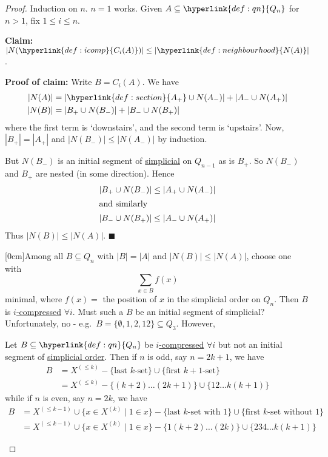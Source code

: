 \documentclass{article}
\let\subset\subseteq
\begin{document}
\begin{proof}
  Induction on $n$. $n=1$ works.
  Given $A \subset \hyperlink{def:qn}{Q_n}$ for $n > 1$, fix $1 \leq i \leq n$.

  \textbf{Claim:} $|N(\hyperlink{def:icomp}{C_i(A)})| \leq |\hyperlink{def:neighbourhood}{N(A)}|$.

  \textbf{Proof of claim:} Write $B = C_i(A)$.
  We have
  \begin{align*}
    |N(A)| &= |\hyperlink{def:section}{A_+} \cup N(A_-)| + |A_- \cup N(A_+)| \\
    |N(B)| &= |B_+ \cup N(B_-)| + |B_- \cup N(B_+)|
  \end{align*}
  where the first term is `downstairs', and the second term is `upstairs'.
  Now, $|B_+| = |A_+|$ and $|N(B_-)| \leq |N(A_-)|$ by induction.

  But $N(B_-)$ is an initial segment of \hyperlink{def:simplicial}{simplicial} on $Q_{n-1}$ as is $B_+$.
  So $N(B_-)$ and $B_+$ are nested (in some direction).
  Hence
  \begin{align*}
    |B_+ \cup N(B_-)| &\leq |A_+ \cup N(A_-)| \\
    \shortintertext{and similarly}
    |B_- \cup N(B_+)| &\leq |A_- \cup N(A_+)|
  \end{align*}
  Thus $|N(B)| \leq |N(A)|$. $\blacksquare$

  [0cm]Among all $B \subset Q_n$ with $|B| = |A|$ and $|N(B)| \leq |N(A)|$, choose one with
  \begin{equation*}
    \sum_{x \in B} f(x)
  \end{equation*}
  minimal, where $f(x)=$ the position of $x$ in the simplicial order on $Q_n$.
  Then $B$ is \hyperlink{def:icomp}{$i$-compressed} $\forall i$.
  Must such a $B$ be an initial segment of simplicial?
  Unfortunately, no - e.g.\ $B = \{\emptyset,1,2,12\} \subset Q_3$.
  However,
  \begin{nlemma}\label{lem:2.2}
    Let $B \subset \hyperlink{def:qn}{Q_n}$ be \hyperlink{def:icomp}{$i$-compressed} $\forall i$ but not an initial segment of \hyperlink{def:simplicial}{simplicial order}.
    Then if $n$ is odd, say $n = 2k+1$, we have
    \begin{align*}
      B &= X^{(\leq k)} - \{\text{last $k$-set}\} \cup {\{\text{first $k+1$-set}\}}\\
        &= X^{(\leq k)} - \{(k+2) \dotsc (2k+1)\} \cup \{12\dotsc k(k+1)\}
    \end{align*}
    while if $n$ is even, say $n = 2k$, we have
    \begin{align*}
      B &= X^{(\leq k-1)} \cup \{x \in X^{(k)} \mid 1 \in x\} - \{\text{last $k$-set with 1}\} \cup \{\text{first $k$-set without $1$}\}\\
        &= X^{(\leq k-1)} \cup \{x \in X^{(k)} \mid 1 \in x\} - \{1(k+2)\dotsc(2k)\} \cup \{234\dotsc k(k+1)\}
    \end{align*}
  \end{nlemma}


\end{proof}
\end{document}
